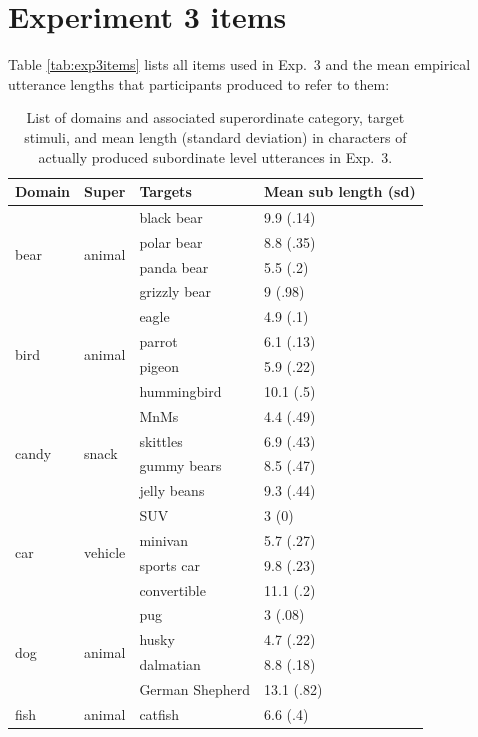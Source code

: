 \documentclass[11pt]{article}
\newcommand{\tableref}[1]{Table \ref{#1}}
\begin{document}
\section{Experiment 3 items}
\label{app:taxonomicstimuli}


\tableref{tab:exp3items} lists all items used in Exp.~3 and the mean empirical utterance lengths that participants produced to refer to them:

\begin{table}
\centering
\caption{List of domains and associated superordinate category, target stimuli, and mean length (standard deviation) in characters of actually produced subordinate level utterances in Exp.~3.}
	\label{tab:reflevelstimuli}
	\begin{tabular}{l l l l}
	\toprule
	Domain & Super & Targets & Mean sub length (sd)\\
	\midrule
	\multirow{4}{*}{bear} & \multirow{4}{*}{animal} & black bear & 9.9 (.14)\\
	& & polar bear & 8.8 (.35)\\
	& & panda bear & 5.5 (.2)\\
	& & grizzly bear & 9 (.98)\\
	\midrule
	\multirow{4}{*}{bird} & \multirow{4}{*}{animal} & eagle & 4.9 (.1)\\
	& 	& parrot & 6.1 (.13)\\
	& & pigeon & 5.9 (.22)\\
	& 	& hummingbird & 10.1 (.5)\\
	\midrule
	\multirow{4}{*}{candy} & \multirow{4}{*}{snack} & MnMs & 4.4 (.49)\\
		& & skittles & 6.9 (.43)\\
		& & gummy bears & 8.5 (.47)\\
		& & jelly beans & 9.3 (.44)\\
	\midrule
	\multirow{4}{*}{car} & \multirow{4}{*}{vehicle} & SUV & 3 (0)\\
		& & minivan & 5.7 (.27)\\
		& & sports car & 9.8 (.23)\\
		& & convertible & 11.1 (.2)\\
	\midrule
	\multirow{4}{*}{dog} & \multirow{4}{*}{animal} & pug & 3 (.08)\\
		& & husky & 4.7 (.22)\\
		& & dalmatian & 8.8 (.18)\\
		& & German Shepherd & 13.1 (.82)\\
	\midrule
	\multirow{4}{*}{fish} & \multirow{4}{*}{animal} & catfish & 6.6 (.4)\\

\end{tabular}
\end{table}
\end{document}
